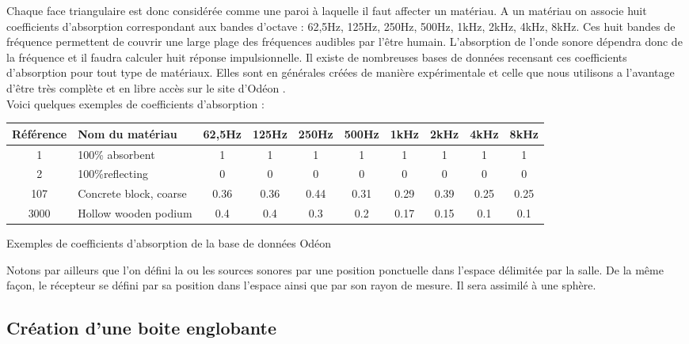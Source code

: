 Chaque face triangulaire est donc considérée comme une paroi à laquelle il faut affecter un matériau. A un matériau on associe huit coefficients d'absorption correspondant aux bandes d'octave : 62,5Hz, 125Hz, 250Hz, 500Hz, 1kHz, 2kHz, 4kHz, 8kHz. Ces huit bandes de fréquence permettent de couvrir une large plage des fréquences audibles par l'être humain. L'absorption de l'onde sonore dépendra donc de la fréquence et il faudra calculer huit réponse impulsionnelle. Il existe de nombreuses bases de données recensant ces coefficients d'absorption pour tout type de matériaux. Elles sont en générales créées de manière expérimentale et celle que nous utilisons a l'avantage d'être très complète et en libre accès sur le site d'Odéon \cite[Materials]{odeon}.\\

Voici quelques exemples de coefficients d'absorption :
\begin{tableth}
\footnotesize
	\begin{tabular}{| c | m{2.5cm} | *{8}{c|}}
		\hline
		Référence & Nom du matériau & 62,5Hz & 125Hz & 250Hz & 500Hz & 1kHz & 2kHz & 4kHz & 8kHz \\
		  \hline
		  \hline
		   1 & 100\% absorbent & 1 & 1 & 1 & 1 & 1 & 1 & 1 & 1 \\
		   \hline
		2 & 100\%reflecting & 0 & 0 & 0 & 0 & 0 & 0 & 0 & 0 \\
		   \hline
		107 & Concrete block, coarse\footnotemark & 0.36 & 0.36 & 0.44 & 0.31 & 0.29 & 0.39 & 0.25 & 0.25 \\
		   \hline
		3000 & Hollow wooden podium\footnotemark & 0.4 & 0.4 & 0.3 & 0.2 & 0.17 & 0.15 & 0.1 & 0.1 \\
	     \hline
	 \end{tabular}
	\caption{Exemples de coefficients d'absorption de la base de données Odéon}
	\label{exempleOdeon}
\end{tableth}
\addtocounter{footnote}{-1}
\addtocounter{footnote}{1}

Notons par ailleurs que l'on défini la ou les sources sonores par une position ponctuelle dans l'espace délimitée par la salle. De la même façon, le récepteur se défini par sa position dans l'espace ainsi que par son rayon de mesure. Il sera assimilé à une sphère.

\subsection{Création d'une boite englobante}


